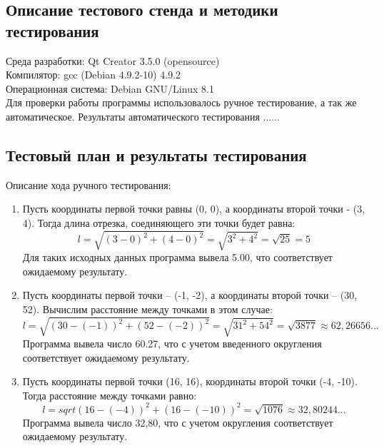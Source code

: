 \documentclass[12pt,a4paper]{report}
\begin{document}
\subsection{Описание тестового стенда и методики тестирования}
Среда разработки: Qt Creator 3.5.0 (opensource) \\
Компилятор: gcc (Debian 4.9.2-10) 4.9.2 \\
Операционная система: Debian GNU/Linux 8.1 \\
Для проверки работы программы использовалось ручное тестирование, а так же автоматическое. Результаты автоматического тестирования ......
\subsection{Тестовый план и результаты тестирования}
Описание хода ручного тестирования:
\begin{enumerate}
\item
Пусть координаты первой точки равны (0, 0), а координаты второй точки - (3, 4). Тогда длина отрезка, соединяющего эти точки будет равна: 
\begin{equation}
l = \sqrt{(3 - 0) ^ 2 + (4 - 0) ^ 2} = \sqrt{3 ^ 2 + 4 ^ 2} = \sqrt{25} = 5
\end{equation}
Для таких исходных данных программа вывела 5.00, что соответствует ожидаемому результату.
\item 
Пусть координаты первой точки -- (-1, -2), а координаты второй точки -- (30, 52). Вычислим расстояние между точками в этом случае:
\begin{equation}
l = \sqrt{(30 - (-1))^2 + (52 - (-2))^2} = \sqrt{31^2 + 54^2} = \sqrt{3877} \approx 62,26656...
\end{equation}
Программа вывела число 60.27, что с учетом введенного округления соответствует ожидаемому результату.
\item
Пусть координаты первой точки (16, 16), координаты второй точки (-4, -10). Тогда расстояние между точками равно:
\begin{equation}
l = sqrt{(16 - (-4))^2 + (16 - (-10))^2} = \sqrt{1076} \approx 32,80244...
\end{equation}
Программа вывела число 32,80, что с учетом округления соответствует ожидаемому результату. 
\end{enumerate} 
\end{document}
